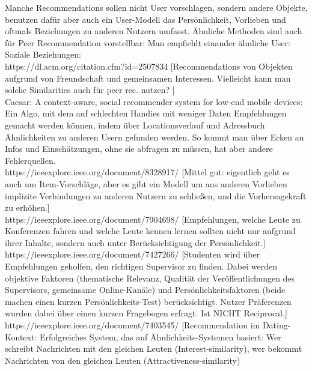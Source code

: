 \documentclass[nochapterpage,bigchapter,linedtoc,longdoc,colorback,accentcolor=tud3b,oneside]{tudreport}
\begin{document}
Manche Recommendations sollen nicht User vorschlagen, sondern andere Objekte, benutzen dafür aber auch ein User-Modell das Persönlichkeit, Vorlieben und oftmals Beziehungen zu anderen Nutzern umfasst. Ähnliche Methoden sind auch für Peer Recommendation vorstellbar: Man empfiehlt einander ähnliche User: \\

Soziale Beziehungen:\\

https://dl.acm.org/citation.cfm?id=2507834 [Recommendations von Objekten aufgrund von Freundschaft und gemeinsamen Interessen. Vielleicht kann man solche Similarities auch für peer rec. nutzen? ] \cite{feng2013recommendation}\\

Caesar: A context-aware, social recommender system for low-end mobile devices: Ein Algo, mit dem auf schlechten Handies mit weniger Daten Empfehlungen gemacht werden können, indem über Locationsverlauf und Adressbuch Ähnlichkeiten zu anderen Usern gefunden werden. So kommt man über Ecken an Infos und Einschätzungen, ohne sie abfragen zu müssen, hat aber andere Fehlerquellen. \cite{ramaswamy2009caesar}\\

https://ieeexplore.ieee.org/document/8328917/ [Mittel gut: eigentlich geht es auch um Item-Vorschläge, aber es gibt ein Modell um aus anderen Vorlieben implizite Verbindungen zu anderen Nutzern zu schließen, und die Vorhersagekraft zu erhöhen.] \cite{hsu2018general}\\

https://ieeexplore.ieee.org/document/7904698/  [Empfehlungen, welche Leute zu Konferenzen fahren und welche Leute kennen lernen sollten nicht nur aufgrund ihrer Inhalte, sondern auch unter Berücksichtigung der Persönlichkeit.] \cite{asabere2017improving}\\

https://ieeexplore.ieee.org/document/7427266/ [Studenten wird über Empfehlungen geholfen, den richtigen Supervisor zu finden. Dabei werden objektive Faktoren (thematische Relevanz, Qualität der Veröffentlichungen des Supervisors, gemeinsame Online-Kanäle) und Persönlichkeitsfaktoren (beide machen einen kurzen Persönlichkeits-Test) berücksichtigt. Nutzer Präferenzen wurden dabei über einen kurzen Fragebogen erfragt. Ist NICHT Reciprocal.]\cite{zhang2016personality}\\

https://ieeexplore.ieee.org/document/7403545/  [Recommendation im Dating-Kontext: Erfolgreiches System, das auf Ähnlichkeits-Systemen basiert: Wer schreibt Nachrichten mit den gleichen Leuten (Interest-similarity), wer bekommt Nachrichten von den gleichen Leuten (Attractiveness-similarity) \cite{xia2015reciprocal}\\
\end{document}
